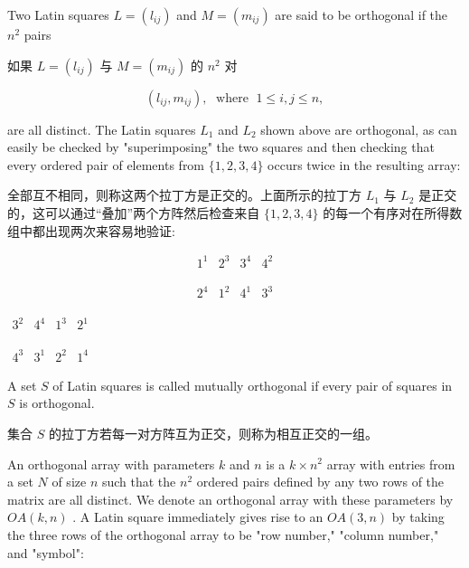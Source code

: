 \documentclass[10pt]{article}
\begin{document}
Two Latin squares \(L = \left( {l}_{ij}\right)\) and \(M = \left( {m}_{ij}\right)\) are said to be orthogonal if the \({n}^{2}\) pairs

\begin{tcolorbox}\relax
如果 \(L = \left( {l}_{ij}\right)\) 与 \(M = \left( {m}_{ij}\right)\) 的 \({n}^{2}\) 对
\end{tcolorbox}

\[
\left( {{l}_{ij},{m}_{ij}}\right) ,\;\text{ where }\;1 \leq  i,j \leq  n,
\]

are all distinct. The Latin squares \({L}_{1}\) and \({L}_{2}\) shown above are orthogonal, as can easily be checked by "superimposing" the two squares and then checking that every ordered pair of elements from \(\{ 1,2,3,4\}\) occurs twice in the resulting array:

\begin{tcolorbox}\relax
全部互不相同，则称这两个拉丁方是正交的。上面所示的拉丁方 \({L}_{1}\) 与 \({L}_{2}\) 是正交的，这可以通过“叠加”两个方阵然后检查来自 \(\{ 1,2,3,4\}\) 的每一个有序对在所得数组中都出现两次来容易地验证:
\end{tcolorbox}

\[
\begin{array}{llll} {1}^{1} & {2}^{3} & {3}^{4} & {4}^{2} \end{array}
\]

\[
\begin{array}{llll} {2}^{4} & {1}^{2} & {4}^{1} & {3}^{3} \end{array}
\]

\(\begin{array}{llll} {3}^{2} & {4}^{4} & {1}^{3} & {2}^{1} \end{array}\)

\(\begin{array}{llll} {4}^{3} & {3}^{1} & {2}^{2} & {1}^{4} \end{array}\)

A set \(S\) of Latin squares is called mutually orthogonal if every pair of squares in \(S\) is orthogonal.

\begin{tcolorbox}\relax
集合 \(S\) 的拉丁方若每一对方阵互为正交，则称为相互正交的一组。
\end{tcolorbox}

An orthogonal array with parameters \(k\) and \(n\) is a \(k \times  {n}^{2}\) array with entries from a set \(N\) of size \(n\) such that the \({n}^{2}\) ordered pairs defined by any two rows of the matrix are all distinct. We denote an orthogonal array with these parameters by \({OA}\left( {k,n}\right)\) . A Latin square immediately gives rise to an \({OA}\left( {3,n}\right)\) by taking the three rows of the orthogonal array to be "row number," "column number," and "symbol":
\end{document}
